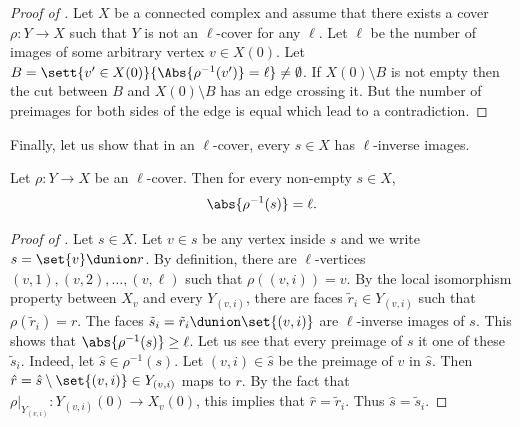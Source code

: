 \begin{proof}[Proof of ]
    Let \(X\) be a connected complex and assume that there exists a cover \(\rho:Y\to X\) such that \(Y\) is not an \(\ell\)-cover for any \(\ell\). Let \(\ell\) be the number of images of some arbitrary vertex \(v \in X(0)\). Let \(B = \sett{v' \in X(0)}{\Abs{\rho^{-1}(v')} = \ell} \ne \emptyset\). If \(X(0) \setminus B\) is not empty then the cut between \(B\) and \(X(0) \setminus B\) has an edge crossing it. But the number of preimages for both sides of the edge is equal which lead to a contradiction.
\end{proof}

Finally, let us show that in an \(\ell\)-cover, every \(s \in X\) has \(\ell\)-inverse images.
\begin{claim} \label{claim:inverse-image-of-l-cover}
    Let \(\rho:Y \to X\) be an \(\ell\)-cover. Then for every non-empty \(s \in X\),
    \[\abs{\rho^{-1}(s)} = \ell.\]
\end{claim}

\begin{proof}[Proof of ]
    Let \(s \in X\). Let \(v \in s\) be any vertex inside \(s\) and we write \(s = \set{v} \dunion r\). By definition, there are \(\ell\)-vertices \((v,1),(v,2),\dots,(v,\ell)\) such that \(\rho((v,i)) = v\). By the local isomorphism property between \(X_v\) and every \(Y_{(v,i)}\), there are faces \(\tilde{r}_i \in Y_{(v,i)}\) such that \(\rho(\tilde{r}_i) = r\). The faces \(\tilde{s}_i = \tilde{r}_i \dunion \set{(v,i)}\) are \(\ell\)-inverse images of \(s\). This shows that \(\abs{\rho^{-1}(s)} \geq \ell\). Let us see that every preimage of \(s\) it one of these \(\tilde{s}_i\). Indeed, let \(\hat{s} \in \rho^{-1}(s)\). Let \((v,i) \in \hat{s}\) be the preimage of \(v\) in \(\hat{s}\). Then \(\hat{r} = \hat{s} \setminus \set{(v,i)} \in Y_{(v,i)}\) maps to \(r\). By the fact that \(\rho|_{Y_{(v,i)}}:Y_{(v,i)}(0) \to X_v(0)\), this implies that \(\hat{r}=\tilde{r}_i\). Thus \(\hat{s}= \tilde{s}_i\).
\end{proof}


